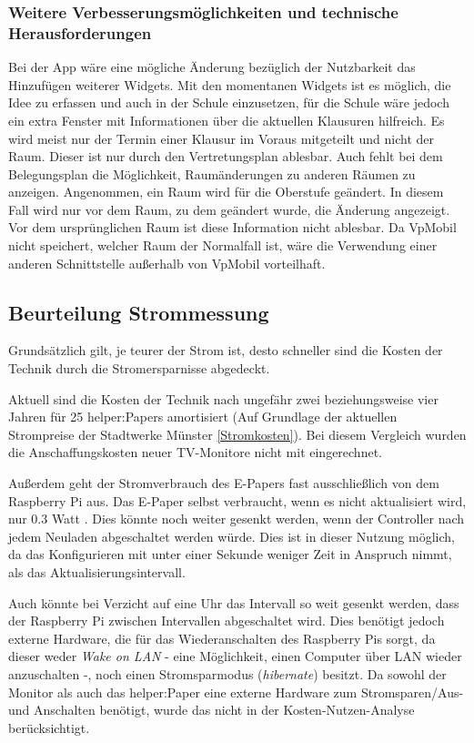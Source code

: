 \documentclass[10pt]{article}
\begin{document}
\subsubsection{Weitere Verbesserungsmöglichkeiten und technische Herausforderungen}
Bei der App wäre eine mögliche Änderung bezüglich der Nutzbarkeit das Hinzufügen weiterer Widgets. Mit den momentanen Widgets ist es möglich, die Idee zu erfassen und auch in der Schule einzusetzen, für die Schule wäre jedoch ein extra Fenster mit Informationen über die aktuellen Klausuren hilfreich. Es wird meist nur der Termin einer Klausur im Voraus mitgeteilt und nicht der Raum. Dieser ist nur durch den Vertretungsplan ablesbar. Auch fehlt bei dem Belegungsplan die Möglichkeit, Raumänderungen zu anderen Räumen zu anzeigen. Angenommen, ein Raum wird für die Oberstufe geändert. In diesem Fall wird nur vor dem Raum, zu dem geändert wurde, die Änderung angezeigt. Vor dem ursprünglichen Raum ist diese Information nicht ablesbar.
Da VpMobil nicht speichert, welcher Raum der Normalfall ist, wäre die Verwendung einer anderen Schnittstelle außerhalb von VpMobil vorteilhaft.

\subsection{Beurteilung Strommessung}\label{Strommessung}
Grundsätzlich gilt, je teurer der Strom ist, desto schneller sind die Kosten der Technik durch die Stromersparnisse abgedeckt. 

Aktuell sind die Kosten der Technik nach ungefähr zwei beziehungsweise vier Jahren für 25 helper:Papers amortisiert (Auf Grundlage der aktuellen Strompreise der Stadtwerke Münster \ref{Stromkosten}).
Bei diesem Vergleich wurden die Anschaffungskosten neuer TV-Monitore nicht mit eingerechnet.  

Außerdem geht der Stromverbrauch des E-Papers fast ausschließlich von dem Raspberry Pi aus. Das E-Paper selbst verbraucht, wenn es nicht aktualisiert wird, nur 0.3 Watt \cite{ourepd}.
Dies könnte noch weiter gesenkt werden, wenn der Controller nach jedem Neuladen abgeschaltet werden würde. Dies ist in dieser Nutzung möglich, da das Konfigurieren mit unter einer Sekunde weniger Zeit in Anspruch nimmt, als das Aktualisierungsintervall. 

Auch könnte bei Verzicht auf eine Uhr das Intervall so weit gesenkt werden, dass der Raspberry Pi zwischen Intervallen abgeschaltet wird. Dies benötigt jedoch externe Hardware, die für das Wiederanschalten des Raspberry Pis sorgt, da dieser weder \textit{Wake on LAN} - eine Möglichkeit, einen Computer über LAN wieder anzuschalten -, noch einen Stromsparmodus (\textit{hibernate}) besitzt. Da sowohl der Monitor als auch das helper:Paper eine externe Hardware zum Stromsparen/Aus- und Anschalten benötigt, wurde das nicht in der Kosten-Nutzen-Analyse berücksichtigt. 
\end{document}
